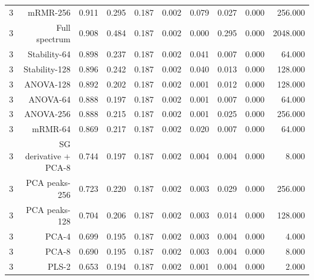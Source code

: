 \begin{table}[t]
\begin{tabular}{lrrrrrrrrr}
3 & mRMR-256 & 0.911 & 0.295 & 0.187 & 0.002 & 0.079 & 0.027 & 0.000 & 256.000 \\
3 & Full spectrum & 0.908 & 0.484 & 0.187 & 0.002 & 0.000 & 0.295 & 0.000 & 2048.000 \\
3 & Stability-64 & 0.898 & 0.237 & 0.187 & 0.002 & 0.041 & 0.007 & 0.000 & 64.000 \\
3 & Stability-128 & 0.896 & 0.242 & 0.187 & 0.002 & 0.040 & 0.013 & 0.000 & 128.000 \\
3 & ANOVA-128 & 0.892 & 0.202 & 0.187 & 0.002 & 0.001 & 0.012 & 0.000 & 128.000 \\
3 & ANOVA-64 & 0.888 & 0.197 & 0.187 & 0.002 & 0.001 & 0.007 & 0.000 & 64.000 \\
3 & ANOVA-256 & 0.888 & 0.215 & 0.187 & 0.002 & 0.001 & 0.025 & 0.000 & 256.000 \\
3 & mRMR-64 & 0.869 & 0.217 & 0.187 & 0.002 & 0.020 & 0.007 & 0.000 & 64.000 \\
3 & SG derivative + PCA-8 & 0.744 & 0.197 & 0.187 & 0.002 & 0.004 & 0.004 & 0.000 & 8.000 \\
3 & PCA peaks-256 & 0.723 & 0.220 & 0.187 & 0.002 & 0.003 & 0.029 & 0.000 & 256.000 \\
3 & PCA peaks-128 & 0.704 & 0.206 & 0.187 & 0.002 & 0.003 & 0.014 & 0.000 & 128.000 \\
3 & PCA-4 & 0.699 & 0.195 & 0.187 & 0.002 & 0.003 & 0.004 & 0.000 & 4.000 \\
3 & PCA-8 & 0.690 & 0.195 & 0.187 & 0.002 & 0.003 & 0.004 & 0.000 & 8.000 \\
3 & PLS-2 & 0.653 & 0.194 & 0.187 & 0.002 & 0.001 & 0.004 & 0.000 & 2.000 \\
\bottomrule
\end{tabular}
\end{table}
